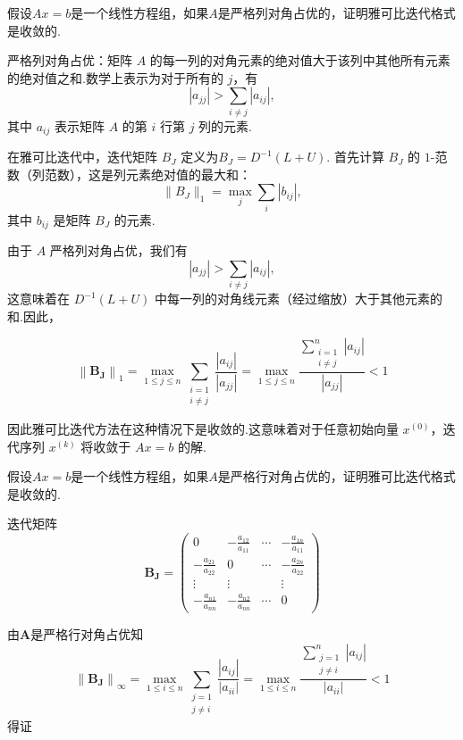 \begin{tcolorbox}[enhanced,colback=10,colframe=9,breakable,coltitle=green!25!black,title=2024]

假设$Ax=b$是一个线性方程组，如果$A$是严格列对角占优的，证明雅可比迭代格式是收敛的.


严格列对角占优：矩阵 $A$ 的每一列的对角元素的绝对值大于该列中其他所有元素的绝对值之和.数学上表示为对于所有的 $j$，有
   $$
   |a_{jj}| > \sum_{i \neq j} |a_{ij}|,
   $$
   其中 $a_{ij}$ 表示矩阵 $A$ 的第 $i$ 行第 $j$ 列的元素.
\tcblower

在雅可比迭代中，迭代矩阵 $B_J$ 定义为$B_J = D^{-1}(L+U).$
首先计算 $B_J$ 的 $1$-范数（列范数），这是列元素绝对值的最大和：
   $$
   \|B_J\|_1 = \max_j \sum_i |b_{ij}|,
   $$
其中 $b_{ij}$ 是矩阵 $B_J$ 的元素.

由于 $A$ 严格列对角占优，我们有
   $$
   |a_{jj}| > \sum_{i \neq j} |a_{ij}|,
   $$
   这意味着在 $D^{-1}(L+U)$ 中每一列的对角线元素（经过缩放）大于其他元素的和.因此，

$$
\left\|\boldsymbol{B_J}\right\|_{1}=\max _{1 \leqslant j \leqslant n} \sum_{\substack{i=1 \\ i \neq j}} \frac{\left|a_{i j}\right|}{\left|a_{jj}\right|}=\max _{1 \leqslant j \leqslant n} \frac{\sum\limits_{\substack{i=1 \\ i \neq j}}^{n}\left|a_{i j}\right|}{\left|a_{jj}\right|}<1
$$
   
因此雅可比迭代方法在这种情况下是收敛的.这意味着对于任意初始向量 $x^{(0)}$，迭代序列 $x^{(k)}$ 将收敛于 $Ax = b$ 的解.
\end{tcolorbox}


\begin{tcolorbox}[enhanced,colback=10,colframe=9,breakable,coltitle=green!25!black,title=2024]

假设$Ax=b$是一个线性方程组，如果$A$是严格行对角占优的，证明雅可比迭代格式是收敛的.

\tcblower
迭代矩阵
$$
\boldsymbol{B_J}=\left(\begin{array}{cccc}
0 & -\frac{a_{12}}{a_{11}} & \cdots & -\frac{a_{1 n}}{a_{11}} \\
-\frac{a_{21}}{a_{22}} & 0 & \cdots & -\frac{a_{2 n}}{a_{22}} \\
\vdots & \vdots & & \vdots \\
-\frac{a_{n 1}}{a_{n n}} & -\frac{a_{n 2}}{a_{n n}} & \cdots & 0
\end{array}\right)
$$

由$\boldsymbol{A}$是严格行对角占优知
$$
\left\|\boldsymbol{B_J}\right\|_{\infty}=\max _{1 \leqslant i \leqslant n} \sum_{\substack{j=1 \\ j \neq i}} \frac{\left|a_{i j}\right|}{\left|a_{i i}\right|}=\max _{1 \leqslant i \leqslant n} \frac{\sum\limits_{\substack{j=1 \\ j \neq i}}^{n}\left|a_{i j}\right|}{\left|a_{i i}\right|}<1
$$
得证
\end{tcolorbox}

